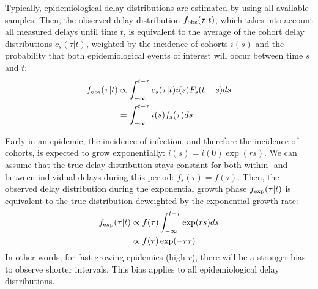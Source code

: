\documentclass[12pt]{article}
\begin{document}
Typically, epidemiological delay distributions are estimated by using all available samples.
Then, the observed delay distribution $f_{\tiny\textrm{obs}}(\tau|t)$, which takes into account all measured delays until time $t$, is equivalent to the average of the cohort delay distributions $c_s(\tau|t)$, weighted by the incidence of cohorts $i(s)$ and the probability that both epidemiological events of interest will occur between time $s$ and $t$:
\begin{equation}
\begin{aligned}
f_{\tiny\textrm{obs}}(\tau|t) &\propto \int_{-\infty}^{t-\tau} c_s(\tau|t) i(s) F_s(t-s) ds\\
&= \int_{-\infty}^{t-\tau} i(s) f_s(\tau) ds
\end{aligned}
\end{equation}

Early in an epidemic, the incidence of infection, and therefore the incidence of cohorts, is expected to grow exponentially: $i(s) = i(0) \exp(rs)$.
We can assume that the true delay distribution stays constant for both within- and between-individual delays during this period: $f_s(\tau) = f(\tau)$.
Then, the observed delay distribution during the exponential growth phase $f_{\tiny\textrm{exp}}(\tau|t)$ is equivalent to the true distribution deweighted by the exponential growth rate:
\begin{equation}
\begin{aligned}
f_{\tiny\textrm{exp}}(\tau|t) &\propto f(\tau) \int_{-\infty}^{t-\tau} \exp(rs) ds\\
&\propto f(\tau) \exp(-r\tau) \\
\label{eq:exp}
\end{aligned}
\end{equation}
In other words, for fast-growing epidemics (high $r$), there will be a stronger bias to observe shorter intervals.
This bias applies to all epidemiological delay distributions.
\end{document}
